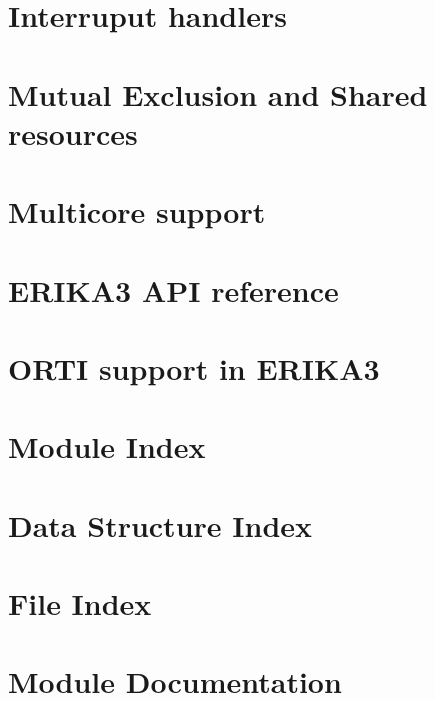 \let\mypdfximage\pdfximage\def\pdfximage{\immediate\mypdfximage}\documentclass[twoside]{book}
\newcommand{\+}{\discretionary{\mbox{\scriptsize$\hookleftarrow$}}{}{}}
\begin{document}
\chapter{Interruput handlers}
\label{irq}

\chapter{Mutual Exclusion and Shared resources}
\label{resources}

\chapter{Multicore support}
\label{multicore}

\chapter{E\+R\+I\+K\+A3 A\+PI reference}
\label{apireference}

\chapter{O\+R\+TI support in E\+R\+I\+K\+A3}
\label{orti}

\chapter{Module Index}

\chapter{Data Structure Index}

\chapter{File Index}

\chapter{Module Documentation}










\end{document}
